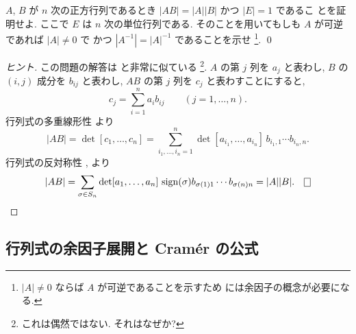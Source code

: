 \documentclass[12pt,twoside]{jarticle}
\begin{document}

\begin{question}
  \label{q:det-hom}
  $A$, $B$ が $n$ 次の正方行列であるとき $|AB|=|A||B|$ かつ $|E|=1$ であるこ
  とを証明せよ. ここで $E$ は $n$ 次の単位行列である. 
  そのことを用いてもしも $A$ が可逆であれば $|A|\ne 0$ で
  かつ $|A^{-1}|=|A|^{-1}$ であることを示せ%
  \footnote{$|A|\ne 0$ ならば $A$ が可逆であることを示すため
    には余因子の概念が必要になる.}. \qed
\end{question}

\begin{proof}[ヒント]
  この問題の解答は  と非常に似ている%
  \footnote{これは偶然ではない. それはなぜか?}.
  $A$ の第 $j$ 列を $a_j$ と表わし, $B$ の $(i,j)$ 成分を $b_{ij}$ と表わし, 
  $AB$ の第 $j$ 列を $c_j$ と表わすことにすると, 
  \begin{equation*}
    c_j = \sum_{i=1}^n a_i b_{ij} 
    \qquad (j=1,\ldots,n).
  \end{equation*}
  行列式の多重線形性  より
  \begin{equation*}
    |AB| = \det[c_1,\ldots,c_n] =
    \sum_{i_1,\ldots,i_n=1}^n 
    \det[a_{i_1},\ldots,a_{i_n}]
    \,b_{i_1,1}\cdots b_{i_n,n}.
  \end{equation*}
  行列式の反対称性 ,  より
  \begin{equation*}
    |AB| = \sum_{\sigma\in S_n}
    \det[a_1,\ldots,a_n] \,\sign(\sigma) 
    b_{\sigma(1)1}\cdots b_{\sigma(n)n}
    =|A||B|.
    \qed
  \end{equation*}
\end{proof}


\subsection{行列式の余因子展開と Cram\'er の公式}
\label{sec:det-cofactor}
\end{document}
